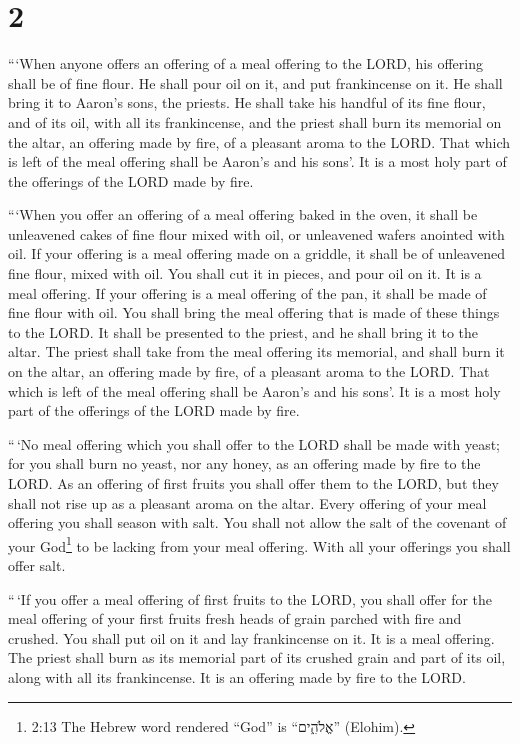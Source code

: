 \hypertarget{section-1}{%
\section{2}\label{section-1}}

 ```When anyone offers an offering of a meal offering to the
LORD, his offering shall be of fine flour. He shall pour oil on it, and
put frankincense on it.  He shall bring it to Aaron's sons,
the priests. He shall take his handful of its fine flour, and of its
oil, with all its frankincense, and the priest shall burn its memorial
on the altar, an offering made by fire, of a pleasant aroma to the LORD.
 That which is left of the meal offering shall be Aaron's
and his sons'. It is a most holy part of the offerings of the LORD made
by fire.

 ```When you offer an offering of a meal offering baked in
the oven, it shall be unleavened cakes of fine flour mixed with oil, or
unleavened wafers anointed with oil.  If your offering is a
meal offering made on a griddle, it shall be of unleavened fine flour,
mixed with oil.  You shall cut it in pieces, and pour oil on
it. It is a meal offering.  If your offering is a meal
offering of the pan, it shall be made of fine flour with oil.
 You shall bring the meal offering that is made of these
things to the LORD. It shall be presented to the priest, and he shall
bring it to the altar.  The priest shall take from the meal
offering its memorial, and shall burn it on the altar, an offering made
by fire, of a pleasant aroma to the LORD.  That which is
left of the meal offering shall be Aaron's and his sons'. It is a most
holy part of the offerings of the LORD made by fire.

 ``\,`No meal offering which you shall offer to the LORD
shall be made with yeast; for you shall burn no yeast, nor any honey, as
an offering made by fire to the LORD.  As an offering of
first fruits you shall offer them to the LORD, but they shall not rise
up as a pleasant aroma on the altar.  Every offering of
your meal offering you shall season with salt. You shall not allow the
salt of the covenant of your God\footnote{2:13 The Hebrew word rendered
  ``God'' is ``אֱלֹהִ֑ים'' (Elohim).} to be lacking from your meal
offering. With all your offerings you shall offer salt.

 ``\,`If you offer a meal offering of first fruits to the
LORD, you shall offer for the meal offering of your first fruits fresh
heads of grain parched with fire and crushed.  You shall
put oil on it and lay frankincense on it. It is a meal offering.
 The priest shall burn as its memorial part of its crushed
grain and part of its oil, along with all its frankincense. It is an
offering made by fire to the LORD.

